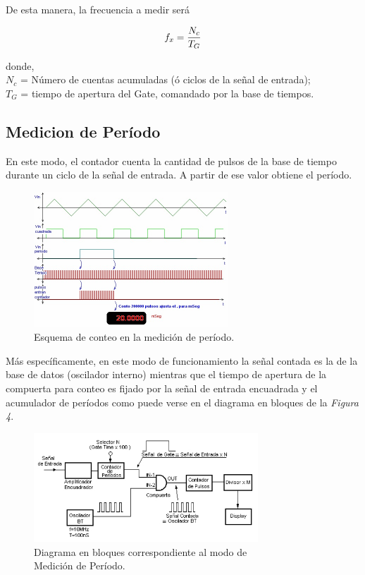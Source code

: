 \documentclass{article}
\begin{document}
	De esta manera, la frecuencia a medir será
\medskip

\begin{equation}
	f_x = {N_c \over T_G}
\end{equation}
\medskip

\noindent donde, \\
$N_c$ = Número de cuentas acumuladas (ó ciclos de la señal de entrada);\\
$T_G$ = tiempo de apertura del Gate, comandado por la base de tiempos.
\bigskip\bigskip



\subsection {Medicion de Período}
\medskip

	En este modo, el contador cuenta la cantidad de pulsos de la base de tiempo durante un ciclo de la señal de entrada. A partir de ese valor obtiene el período. 
\bigskip\bigskip


\begin{figure}[h]
	\centering
	\includegraphics[width=0.65\textwidth]{images/03-ondasPeriodoContador.jpg}
	\medskip
	\caption{Esquema de conteo en la medición de período.}
\end{figure}
\bigskip\bigskip


	Más específicamente, en este modo de funcionamiento la señal contada es la de la base de datos (oscilador interno) mientras que el tiempo de apertura de la compuerta para conteo es fijado por la señal de entrada encuadrada y el acumulador de períodos como puede verse en el diagrama en bloques de la \textit{Figura 4}.
\bigskip\bigskip


\begin{figure}[h]
	\centering
	\includegraphics[width=0.75\textwidth]{images/04-diagrama-en-bloques-modo-medicion-periodo.jpg}
	\medskip
	\caption{Diagrama en bloques correspondiente al modo de\\ Medición de Período.}
\end{figure}
\bigskip\bigskip
\end{document}
